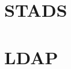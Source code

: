 \documentclass[Main]{subfiles}
\begin{document}
\section{STADS}
\section{LDAP}\label{sec:LDAP}
\end{document}

